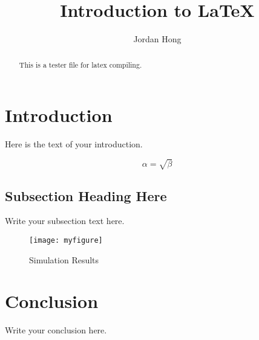 \documentclass{article}
\begin{document}
\title{Introduction to \LaTeX{}}
\author{Jordan Hong}

\maketitle

\begin{abstract}
    This is a tester file for latex compiling.
\end{abstract}

\section{Introduction}
Here is the text of your introduction.

\begin{equation}
    \label{simple_equation}
    \alpha = \sqrt{ \beta }
\end{equation}

\subsection{Subsection Heading Here}
Write your subsection text here.

\begin{figure}
    \centering
    \texttt{[image: myfigure]}
    \caption{Simulation Results}
    \label{simulationfigure}
\end{figure}

\section{Conclusion}
Write your conclusion here.
\end{document}
